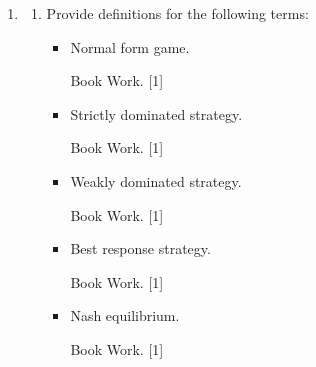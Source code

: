\documentclass[12pt,a4paper,twoside]{article}
\renewcommand{\labelenumi}{\arabic{enumi}} %
\renewcommand{\headrulewidth}{0pt}      %
\begin{document}
\newpage

\renewcommand{\headrulewidth}{0pt}      %
\setlength{\headheight}{15pt}           %

\renewcommand{\familydefault}{\rmdefault}
\rmfamily

\newpage
\begin{enumerate}

\renewcommand\labelenumi{\bfseries\theenumi.}

\item

    \begin{enumerate}
        \item Provide definitions for the following terms:
            \begin{itemize}
                \item Normal form game.

                    \begin{solution}
                        Book Work. \hfill{[1]}
                    \end{solution}

                \item Strictly dominated strategy.

                    \begin{solution}
                        Book Work. \hfill{[1]}
                    \end{solution}


                \item Weakly dominated strategy.

                    \begin{solution}
                        Book Work. \hfill{[1]}
                    \end{solution}

                \item Best response strategy.

                    \begin{solution}
                        Book Work. \hfill{[1]}
                    \end{solution}

                \item Nash equilibrium.

                    \begin{solution}
                        Book Work. \hfill{[1]}
                    \end{solution}



\end{itemize}
\end{enumerate}
\end{enumerate}
\end{document}
